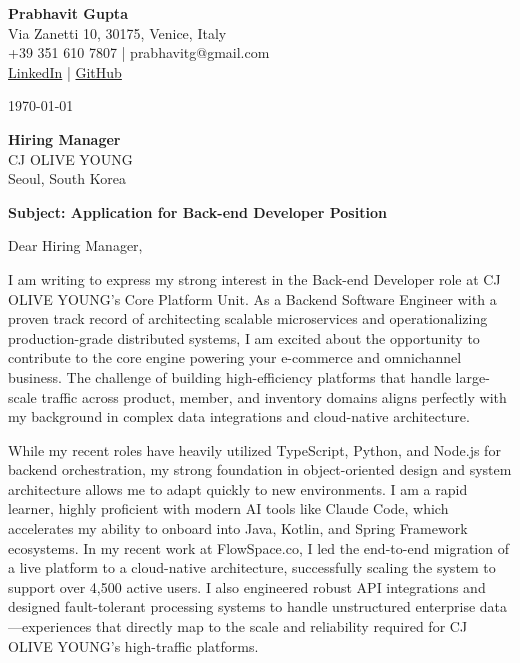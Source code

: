 \documentclass[11pt,a4paper]{article}
\begin{document}
\begin{flushleft}
\textbf{Prabhavit Gupta} \\
Via Zanetti 10, 30175, Venice, Italy \\
+39 351 610 7807 | prabhavitg@gmail.com \\
\href{https://www.linkedin.com/in/prabhavit/}{LinkedIn} | \href{https://github.com/prab-gupta}{GitHub}
\end{flushleft}

\vspace{2em}

\noindent \today

\vspace{1em}

\noindent \textbf{Hiring Manager} \\
CJ OLIVE YOUNG \\
Seoul, South Korea

\vspace{1em}

\noindent \textbf{Subject: Application for Back-end Developer Position}

\vspace{1em}

\noindent Dear Hiring Manager,

\vspace{1em}
\noindent I am writing to express my strong interest in the Back-end Developer role at CJ OLIVE YOUNG's Core Platform Unit. As a Backend Software Engineer with a proven track record of architecting scalable microservices and operationalizing production-grade distributed systems, I am excited about the opportunity to contribute to the core engine powering your e-commerce and omnichannel business. The challenge of building high-efficiency platforms that handle large-scale traffic across product, member, and inventory domains aligns perfectly with my background in complex data integrations and cloud-native architecture.

\vspace{1em}
\noindent While my recent roles have heavily utilized TypeScript, Python, and Node.js for backend orchestration, my strong foundation in object-oriented design and system architecture allows me to adapt quickly to new environments. I am a rapid learner, highly proficient with modern AI tools like Claude Code, which accelerates my ability to onboard into Java, Kotlin, and Spring Framework ecosystems. In my recent work at FlowSpace.co, I led the end-to-end migration of a live platform to a cloud-native architecture, successfully scaling the system to support over 4,500 active users. I also engineered robust API integrations and designed fault-tolerant processing systems to handle unstructured enterprise data—experiences that directly map to the scale and reliability required for CJ OLIVE YOUNG's high-traffic platforms.
\end{document}
